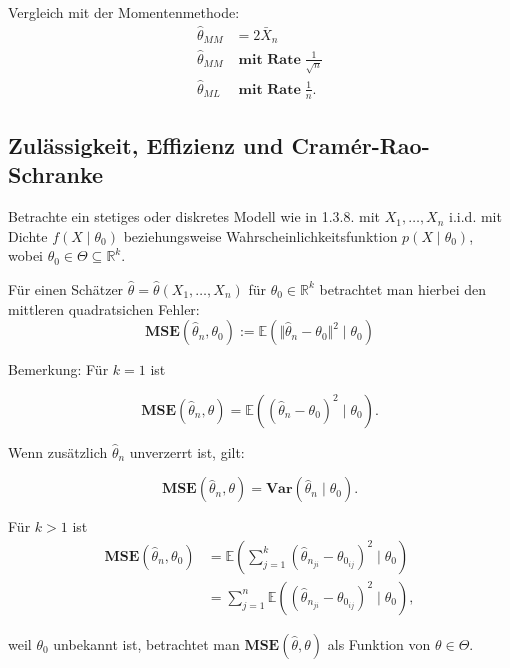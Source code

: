 \documentclass[10pt]{article}
\newcommand{\FZV}{X_1, \ldots, X_n} %
\newcommand{\IR}{\mathbb{R}} %
\newcommand{\EW}{\mathbb{E}} %
\newcommand{\MSE}{\textbf{MSE}} %
\newenvironment{BSP}[1][]
{\begin{Beispiel}[frametitle=#1]}{\end{Beispiel}}
\begin{document}
\begin{BSP}[Beispiel 1.3.11 (Grenzverteilung keine Normalverteilung)]
		Vergleich mit der Momentenmethode:
		\begin{equation*}
			\begin{split}
				\hat{\theta}_{MM}& = 2 \bar{X}_n\\
				\hat{\theta}_{MM}& \; \textbf{mit Rate} \;\frac{1}{\sqrt{n}}\\
				\hat{\theta}_{ML}& \; \textbf{mit Rate} \;\frac{1}{n}.
			\end{split}
		\end{equation*}
	\end{BSP}
	
	\subsection{Zulässigkeit, Effizienz und Cramér-Rao-Schranke}
	
	Betrachte ein stetiges oder diskretes Modell wie in 1.3.8. mit $\FZV$ i.i.d. mit Dichte $f(X\mid \theta_0)$ beziehungsweise Wahrscheinlichkeitsfunktion $p(X \mid \theta_0)$, wobei $\theta_0 \in \Theta \subseteq \IR^k$. 
	
	Für einen Schätzer $\hat{\theta} = \hat{\theta}(X_1, \ldots, X_n)$ für $\theta_0 \in \IR^k$ betrachtet man hierbei den mittleren quadratsichen Fehler:
	\begin{equation*}
		\textbf{MSE}(\hat{\theta}_n, \theta_0) := \EW (\Vert {\hat{\theta}_n-\theta_0}\Vert ^2 \mid \theta_0)
	\end{equation*}
	
	\begin{Bemerkung}[Bemerkung ]
			Bemerkung: Für $k = 1$ ist 
		
		\begin{equation*}
			\textbf{MSE} (\hat{\theta}_n, \theta) = \EW (( {\hat{\theta}_n-\theta_0} )^2 \mid \theta_0).
		\end{equation*}
		
		Wenn zusätzlich 	$\hat{\theta}_n$ unverzerrt ist, gilt: 
		
		\begin{equation*}
			\textbf{MSE} (\hat{\theta}_n, \theta) =  \textbf{Var}(\hat{\theta}_n \mid \theta_0).
		\end{equation*}
		
		Für $k>1$ ist 
		\begin{equation*}
			\begin{split}
				\MSE(\hat{\theta}_n, \theta_0) &= \EW(\sum_{j=1}^{k}(\hat{\theta}_{n_{ji}} - \theta_{0_{ij}})^2 \mid \theta_0 )\\
				&= \sum_{j=1}^{n} \EW ((\hat{\theta}_{n_{ji}} - \theta_{0_{ij}})^2 \mid \theta_0),
			\end{split}
		\end{equation*}
		
		weil $\theta_0$ unbekannt ist, betrachtet man $\MSE(\hat{\theta}, \theta)$ als Funktion von $\theta \in \Theta$.
	\end{Bemerkung}
	
\end{document}

